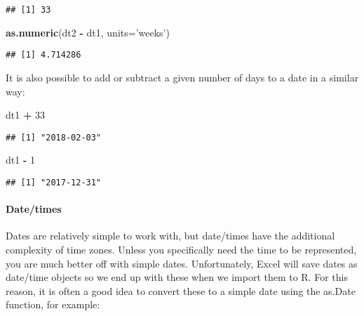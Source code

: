 \documentclass[
]{article}
\newenvironment{Shaded}{\begin{snugshade}}{\end{snugshade}}
\newcommand{\DataTypeTok}[1]{\textcolor[rgb]{0.13,0.29,0.53}{#1}}
\newcommand{\DecValTok}[1]{\textcolor[rgb]{0.00,0.00,0.81}{#1}}
\newcommand{\KeywordTok}[1]{\textcolor[rgb]{0.13,0.29,0.53}{\textbf{#1}}}
\newcommand{\NormalTok}[1]{#1}
\newcommand{\OperatorTok}[1]{\textcolor[rgb]{0.81,0.36,0.00}{\textbf{#1}}}
\newcommand{\StringTok}[1]{\textcolor[rgb]{0.31,0.60,0.02}{#1}}
\begin{document}
\begin{verbatim}
## [1] 33
\end{verbatim}

\begin{Shaded}
\begin{Highlighting}[]
\KeywordTok{as.numeric}\NormalTok{(dt2 }\OperatorTok{-}\StringTok{ }\NormalTok{dt1, }\DataTypeTok{units=}\StringTok{'weeks'}\NormalTok{)}
\end{Highlighting}
\end{Shaded}

\begin{verbatim}
## [1] 4.714286
\end{verbatim}

It is also possible to add or subtract a given number of days to a date
in a similar way:

\begin{Shaded}
\begin{Highlighting}[]
\NormalTok{dt1 }\OperatorTok{+}\StringTok{ }\DecValTok{33}
\end{Highlighting}
\end{Shaded}

\begin{verbatim}
## [1] "2018-02-03"
\end{verbatim}

\begin{Shaded}
\begin{Highlighting}[]
\NormalTok{dt1 }\OperatorTok{-}\StringTok{ }\DecValTok{1}
\end{Highlighting}
\end{Shaded}

\begin{verbatim}
## [1] "2017-12-31"
\end{verbatim}

\hypertarget{datetimes}{%
\paragraph{Date/times}\label{datetimes}}

Dates are relatively simple to work with, but date/times have the
additional complexity of time zones. Unless you specifically need the
time to be represented, you are much better off with simple dates.
Unfortunately, Excel will save dates as date/time objects so we end up
with these when we import them to R. For this reason, it is often a good
idea to convert these to a simple date using the as.Date function, for
example:
\end{document}
